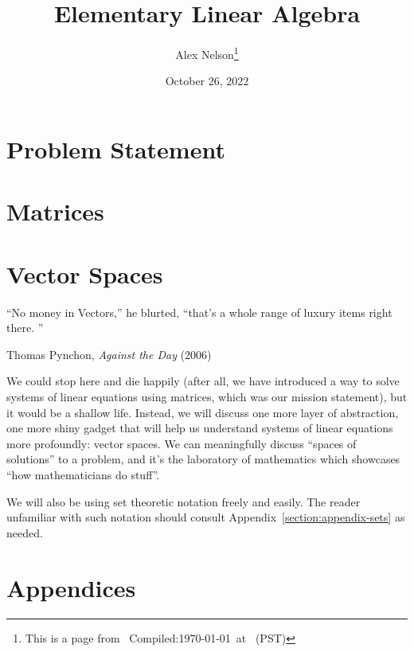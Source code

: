 \documentclass{article}
\title{Elementary Linear Algebra}
\author{Alex Nelson\thanks{This is a page from \homeurl{}\hfil\break\indent\;\, Compiled:\enspace\today\ at \currenttime\ (PST)}}
\date{October 26, 2022}
\begin{document}
\maketitle

\tableofcontents


\part{Problem Statement}

\part{Matrices}\label{part:matrices}




% 

\vfill\eject
\part{Vector Spaces}

\epigraph{``No money in Vectors,'' he blurted, ``that's a whole range of
luxury items right there.%
''}{Thomas Pynchon, \textit{Against the Day} (2006)}

We could stop here and die happily (after all, we have introduced a way
to solve systems of linear equations using matrices, which was our
mission statement), but it would be a shallow
life. Instead, we will discuss one more layer of abstraction, one more
shiny gadget that will help us understand systems of linear equations
more profoundly: vector spaces. We can meaningfully discuss ``spaces of
solutions'' to a problem, and it's the laboratory of mathematics which
showcases ``how mathematicians do stuff''.

We will also be using set theoretic notation freely and easily. The
reader unfamiliar with such notation should consult Appendix~\ref{section:appendix-sets}
as needed.

\vfill\eject







\vfill\eject
\part{Appendices}
\appendix
%
\vfill\eject


\end{document}
